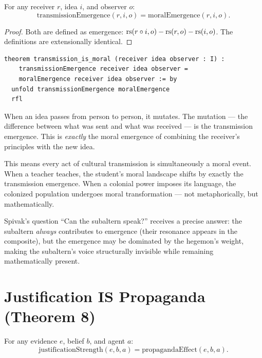 \begin{theorem}
\label{thm:transmission-morality}
For any receiver $r$, idea $i$, and observer $o$:
\[
\text{transmissionEmergence}(r, i, o) = \text{moralEmergence}(r, i, o).
\]
\end{theorem}

\begin{proof}
Both are defined as emergence: $\operatorname{rs}(r \circ i, o) - \operatorname{rs}(r, o) - \operatorname{rs}(i, o)$.  The definitions are extensionally identical.
\end{proof}

\begin{lstlisting}
theorem transmission_is_moral (receiver idea observer : I) :
    transmissionEmergence receiver idea observer =
    moralEmergence receiver idea observer := by
  unfold transmissionEmergence moralEmergence
  rfl
\end{lstlisting}

\begin{interpretation}
When an idea passes from person to person, it mutates.  The mutation --- the difference between what was sent and what was received --- is the transmission emergence.  This is \emph{exactly} the moral emergence of combining the receiver's principles with the new idea.

This means every act of cultural transmission is simultaneously a moral event.  When a teacher teaches, the student's moral landscape shifts by exactly the transmission emergence.  When a colonial power imposes its language, the colonized population undergoes moral transformation --- not metaphorically, but mathematically.

Spivak's question ``Can the subaltern speak?'' receives a precise answer: the subaltern \emph{always} contributes to emergence (their resonance appears in the composite), but the emergence may be dominated by the hegemon's weight, making the subaltern's voice structurally invisible while remaining mathematically present.
\end{interpretation}


\section{Justification IS Propaganda (Theorem 8)}

\begin{theorem}
\label{thm:justification-propaganda}
For any evidence $e$, belief $b$, and agent $a$:
\[
\text{justificationStrength}(e, b, a) = \text{propagandaEffect}(e, b, a).
\]
\end{theorem}

